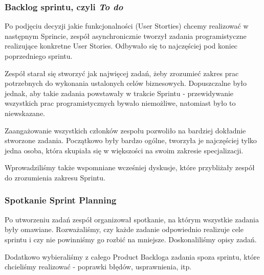 \documentclass{article}
\begin{document}
\subsubsection*{Backlog sprintu, czyli \textit{To do}}
Po podjęciu decyzji jakie funkcjonalności (User Storties) chcemy realizować w następnym Sprincie, zespół asynchronicznie tworzył zadania programistyczne realizujące konkretne User Stories. Odbywało się to najczęściej pod koniec poprzedniego sprintu.

Zespół starał się stworzyć jak najwięcej zadań, żeby zrozumieć zakres prac potrzebnych do wykonania ustalonych celów biznesowych. Dopuszczalne było jednak, aby takie zadania powstawały w trakcie Sprintu - przewidywanie wszystkich prac programistycznych bywało niemożliwe, natomiast było to niewskazane.

Zaangażowanie wszystkich członków zespołu pozwoliło na bardziej dokładnie stworzone zadania. Początkowo były bardzo ogólne, tworzyła je najczęściej tylko jedna osoba, która skupiała się w większości na swoim zakresie specjalizacji.

Wprowadziliśmy także wspomniane wcześniej dyskusje, które przybliżały zespół do zrozumienia zakresu Sprintu.

\subsubsection*{Spotkanie Sprint Planning}
Po utworzeniu zadań zespół organizował spotkanie, na którym wszystkie zadania były omawiane. Rozważaliśmy, czy każde zadanie odpowiednio realizuje cele sprintu i czy nie powinniśmy go rozbić na mniejsze. Doskonaliliśmy opisy zadań.

Dodatkowo wybieraliśmy z całego Product Backloga zadania spoza sprintu, które chcieliśmy realizować - poprawki błędów, usprawnienia, itp.

\printbibliography[title={Przypisy}]
\end{document}
